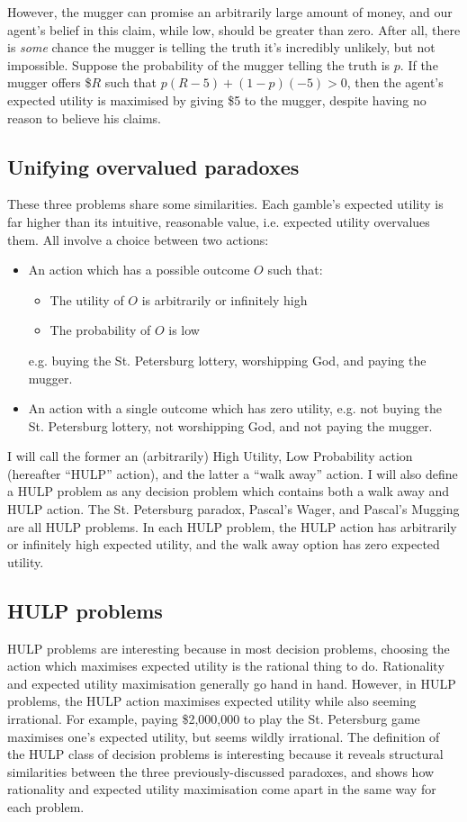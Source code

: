 \documentclass{article}
\begin{document}
However, the mugger can promise an arbitrarily large amount of money, and our agent's belief in this claim, while low, should be greater than zero. After all, there is \textit{some} chance the mugger is telling the truth \textemdash{} it's incredibly unlikely, but not impossible. Suppose the probability of the mugger telling the truth is \(p\). If the mugger offers \$\(R\) such that \(p(R-5)+(1-p)(-5)>0\), then the agent's expected utility is maximised by giving \$5 to the mugger, despite having no reason to believe his claims.

\subsection{Unifying overvalued paradoxes}
These three problems share some similarities. Each gamble's expected utility is far higher than its intuitive, reasonable value, i.e. expected utility overvalues them. All involve a choice between two actions:

\begin{itemize}
\item An action which has a possible outcome \(O\) such that:
\begin{itemize}
\item The utility of \(O\) is arbitrarily or infinitely high
\item The probability of \(O\) is low
\end{itemize}
e.g. buying the St. Petersburg lottery, worshipping God, and paying the mugger.
\item An action with a single outcome which has zero utility, e.g. not buying the St. Petersburg lottery, not worshipping God, and not paying the mugger.
\end{itemize}

I will call the former an (arbitrarily) High Utility, Low Probability action (hereafter ``HULP'' action), and the latter a ``walk away'' action. I will also define a HULP problem as any decision problem which contains both a walk away and HULP action. The St. Petersburg paradox, Pascal's Wager, and Pascal's Mugging are all HULP problems. In each HULP problem, the HULP action has arbitrarily or infinitely high expected utility, and the walk away option has zero expected utility. 

\subsection{HULP problems}

HULP problems are interesting because in most decision problems, choosing the action which maximises expected utility is the rational thing to do. Rationality and expected utility maximisation generally go hand in hand. However, in HULP problems, the HULP action maximises expected utility while also seeming irrational. For example, paying \$2,000,000 to play the St. Petersburg game maximises one's expected utility, but seems wildly irrational. The definition of the HULP class of decision problems is interesting because it reveals structural similarities between the three previously-discussed paradoxes, and shows how rationality and expected utility maximisation come apart in the same way for each problem.
\end{document}
